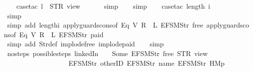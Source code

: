 \begin{isabellebody}
\ \ \isamarkupfalse%
\ {\isacharparenleft}case{\isacharunderscore}tac\ {\isachardoublequoteopen}l\ {\isacharequal}\ STR\ {\isacharprime}{\isacharprime}view{\isacharprime}{\isacharprime}{\isachardoublequoteclose}{\isacharparenright}\isanewline
\ \ \ \isamarkupfalse%
\ \isamarkupfalse%
\ simp\isanewline
\ \ \isamarkupfalse%
\ simp\isanewline
\ \ \isamarkupfalse%
\ {\isacharparenleft}case{\isacharunderscore}tac\ {\isachardoublequoteopen}length\ i\ {\isacharequal}\ {}{\isachardoublequoteclose}{\isacharparenright}\isanewline
\ \ \ \isamarkupfalse%
\ simp\isanewline
\ \ \ \isamarkupfalse%
\ {\isacharparenleft}simp\ add{\isacharcolon}\ length{\isacharunderscore}i{\isacharunderscore}{}\ apply{\isacharunderscore}guards{\isacharunderscore}cons{\isacharbrackleft}of\ {\isachardoublequoteopen}Eq\ {\isacharparenleft}V\ {\isacharparenleft}R\ {}{\isacharparenright}{\isacharparenright}\ {\isacharparenleft}L\ {\isacharparenleft}EFSM{\isachardot}Str\ {\isacharprime}{\isacharprime}free{\isacharprime}{\isacharprime}{\isacharparenright}{\isacharparenright}{\isachardoublequoteclose}{\isacharbrackright}\ apply{\isacharunderscore}guards{\isacharunderscore}cons{\isacharbrackleft}of\ {\isachardoublequoteopen}Eq\ {\isacharparenleft}V\ {\isacharparenleft}R\ {}{\isacharparenright}{\isacharparenright}\ {\isacharparenleft}L\ {\isacharparenleft}EFSM{\isachardot}Str\ {\isacharprime}{\isacharprime}paid{\isacharprime}{\isacharprime}{\isacharparenright}{\isacharparenright}{\isachardoublequoteclose}{\isacharbrackright}{\isacharparenright}\isanewline
\ \ \ \isamarkupfalse%
\ {\isacharparenleft}simp\ add{\isacharcolon}\ Str{\isacharunderscore}def\ implode{\isacharunderscore}free\ implode{\isacharunderscore}paid{\isacharparenright}\isanewline
\ \ \isamarkupfalse%
\ simp%
\endisatagproof
{\isafoldproof}%
%
\isadelimproof
\isanewline
%
\endisadelimproof
\isanewline
{}\isamarkupfalse%
\ no{\isacharunderscore}steps{\isacharcolon}\ {\isachardoublequoteopen}possible{\isacharunderscore}steps\ linkedIn\ {}\ {\isacharless}{}\ {\isachardollar}{\isacharcolon}{\isacharequal}\ Some\ {\isacharparenleft}EFSM{\isachardot}Str\ {\isacharprime}{\isacharprime}free{\isacharprime}{\isacharprime}{\isacharparenright}{\isachargreater}\ STR\ {\isacharprime}{\isacharprime}view{\isacharprime}{\isacharprime}\isanewline
\ \ \ \ \ \ \ \ \ \ \ \ \ \ \ \ \ \ \ {\isacharbrackleft}EFSM{\isachardot}Str\ {\isacharprime}{\isacharprime}otherID{\isacharprime}{\isacharprime}{\isacharcomma}\ EFSM{\isachardot}Str\ {\isacharprime}{\isacharprime}name{\isacharprime}{\isacharprime}{\isacharcomma}\ EFSM{\isachardot}Str\ {\isacharprime}{\isacharprime}HM{}p{\isacharprime}{\isacharprime}{\isacharbrackright}\ {\isacharequal}\ {\isacharbraceleft}{\isacharbar}{\isacharbar}{\isacharbraceright}{\isachardoublequoteclose}\isanewline

\end{isabellebody}
